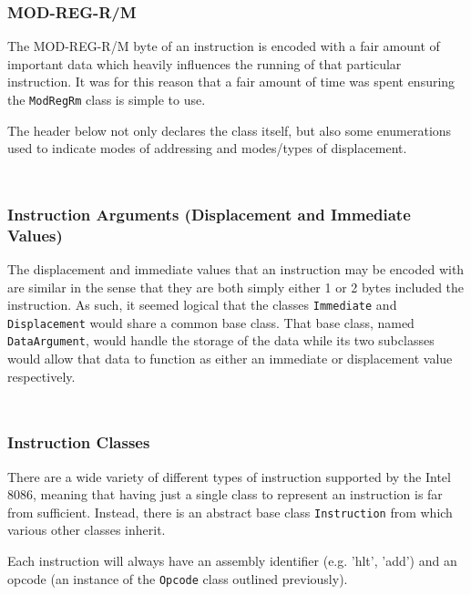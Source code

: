         \inputminted{c++}{opcode.hpp}

        \inputminted{c++}{opcode.cpp}

    \subsubsection{MOD-REG-R/M}
        The MOD-REG-R/M byte of an instruction is encoded with a fair amount of important data which heavily influences the running of that particular instruction. It was for this reason that a fair amount of time was spent ensuring the \texttt{ModRegRm} class is simple to use.

        The header below not only declares the class itself, but also some enumerations used to indicate modes of addressing and modes/types of displacement.

        \inputminted{c++}{modregrm.hpp}

        \inputminted{c++}{modregrm.cpp}

    \subsubsection{Instruction Arguments (Displacement and Immediate Values)}
        The displacement and immediate values that an instruction may be encoded with are similar in the sense that they are both simply either 1 or 2 bytes included the instruction. As such, it seemed logical that the classes \texttt{Immediate} and \texttt{Displacement} would share a common base class. That base class, named \texttt{DataArgument}, would handle the storage of the data while its two subclasses would allow that data to function as either an immediate or displacement value respectively.

        \inputminted{c++}{argument.hpp}

        \inputminted{c++}{argument.cpp}

    \subsubsection{Instruction Classes}
        There are a wide variety of different types of instruction supported by the Intel 8086, meaning that having just a single class to represent an instruction is far from sufficient. Instead, there is an abstract base class \texttt{Instruction} from which various other classes inherit.

        Each instruction will always have an assembly identifier (e.g. 'hlt', 'add') and an opcode (an instance of the \texttt{Opcode} class outlined previously).
